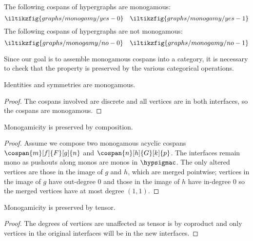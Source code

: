 \begin{example}\label{ex:monogamous}
    The following cospans of hypergraphs are monogamous:
    \[
        \iltikzfig{graphs/monogamy/yes-0}
        \quad
        \iltikzfig{graphs/monogamy/yes-1}
    \]
    The following cospans of hypergraphs are not monogamous:
    \[
        \iltikzfig{graphs/monogamy/no-0}
        \quad
        \iltikzfig{graphs/monogamy/no-1}
    \]
\end{example}

Since our goal is to assemble monogamous cospans into a category, it is
necessary to check that the property is preserved by the various categorical
operations.

\begin{lemma}\label{lem:identities-symmetries-monogamous}
    Identities and symmetries are monogamous.
\end{lemma}
\begin{proof}
    The cospans involved are discrete and all vertices are in both
    interfaces, so the cospans are monogamous.
\end{proof}

\begin{lemma}\label{lem:monogamicity-preserved-composition}
    Monogamicity is preserved by composition.
\end{lemma}
\begin{proof}
    Assume we compose two monogamous acyclic cospans \(
    \cospan{m}[f]{F}[g]{n}
    \) and \(
    \cospan{n}[h]{G}[k]{p}
    \).
    The interfaces remain mono as pushouts along monos are monos in
    \(\hypsigmac\).
    The only altered vertices are those in the image of
    \(g\) and \(h\), which are merged pointwise; vertices in the image of
    \(g\) have out-degree \(0\) and those in the image of \(h\) have in-degree
    \(0\) so the merged vertices have at most degree \((1, 1)\).
\end{proof}

\begin{lemma}\label{lem:monogamicity-preserved-tensor}
    Monogamicity is preserved by tensor.
\end{lemma}
\begin{proof}
    The degrees of vertices are unaffected as tensor is by coproduct and
    only vertices in the original interfaces will be in the new interfaces.
\end{proof}

